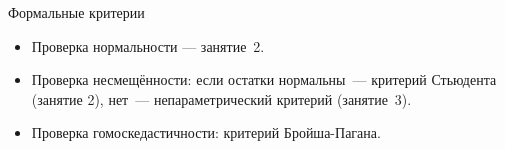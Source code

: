 \documentclass[9pt,pdf,utf8,hyperref={unicode},aspectratio=169]{beamer}
\begin{document}
\begin{frame}{Формальные критерии}
    \begin{itemize}
    \item Проверка нормальности --- занятие~2.
    \item Проверка несмещённости: если остатки нормальны~--- критерий Стьюдента (занятие 2), нет~--- непараметрический критерий (занятие~3).
    \item Проверка гомоскедастичности: критерий Бройша-Пагана.
    \end{itemize}
\end{frame}
\end{document}
